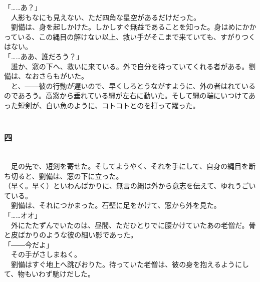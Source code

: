 \documentclass[
  paper=a5,
  fontsize=10pt,
  jafontsize=9.5pt,
  tate,                  %
  open_bracket_pos=nibu, %
]{jlreq}
\begin{document}
「……あ？」\\


　人影もなにも見えない、ただ四角な星空があるだけだった。\\


　劉備は、身を起しかけた。しかしすぐ無益であることを知った。身はめにかかっている、この縄目の解けない以上、救い手がそこまで来ていても、すがりつくはない。\\


「……ああ、誰だろう？」\\


　誰か、窓の下へ、救いに来ている。外で自分を待っていてくれる者がある。劉備は、なおさらもがいた。\\


　と、――彼の行動が遅いので、早くしろとうながすように、外の者はれているのであろう。高窓から垂れている縄が左右に動いた。そして縄の端にいつけてあった短剣が、白い魚のように、コトコトとのを打って躍った。\\

\\

\subsubsection{四}

\\


　足の先で、短剣を寄せた。そしてようやく、それを手にして、自身の縄目を断ち切ると、劉備は、窓の下に立った。\\


（早く。早く）といわんばかりに、無言の縄は外から意志を伝えて、ゆれうごいている。\\


　劉備は、それにつかまった。石壁に足をかけて、窓から外を見た。\\


「……オオ」\\


　外にたたずんでいたのは、昼間、ただひとりでに腰かけていたあの老僧だ。骨と皮ばかりのような彼の細い影であった。\\


「――今だよ」\\


　その手がさしまねく。\\


　劉備はすぐ地上へ跳びおりた。待っていた老僧は、彼の身を抱えるようにして、物もいわず馳けだした。\\
\end{document}
